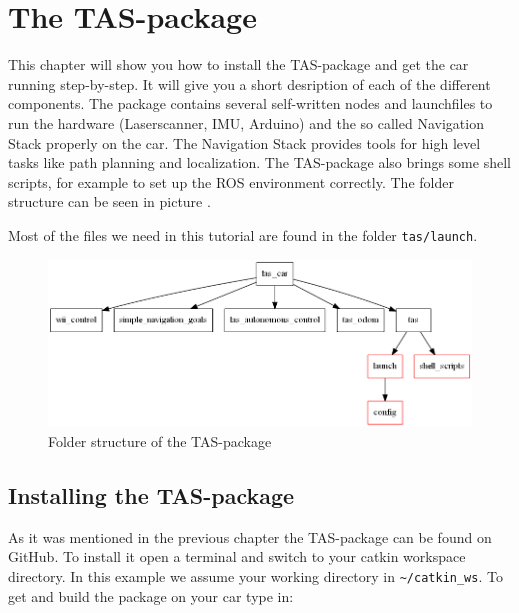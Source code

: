 
\chapter{The TAS-package}
\label{sec:tas_package}

This chapter will show you how to install the TAS-package and get the car running step-by-step. It will give you a short desription of each of the different components. The package contains several self-written nodes and launchfiles to run the hardware (Laserscanner, IMU, Arduino) and the so called Navigation Stack properly on the car. The Navigation Stack provides tools for high level tasks like path planning and localization. The TAS-package also brings some shell scripts, for example to set up the ROS environment correctly. The folder structure can be seen in picture .

Most of the files we need in this tutorial are found in the folder \texttt{tas/launch}.

\begin{figure}[htbp]
	\centering
		\includegraphics[width=\textwidth]{diagrams/tas_folder_struct}
	\caption{Folder structure of the TAS-package}
	\label{fig:tas_folder_struct}
\end{figure}

\newpage
\section{Installing the TAS-package}
\label{sec:tas_package_install} 

As it was mentioned in the previous chapter the TAS-package can be found on GitHub. To install it open a terminal and switch to your catkin workspace directory. In this example we assume your working directory in \texttt{\textasciitilde/catkin\_ws}. To get and build the package on your car type in:

